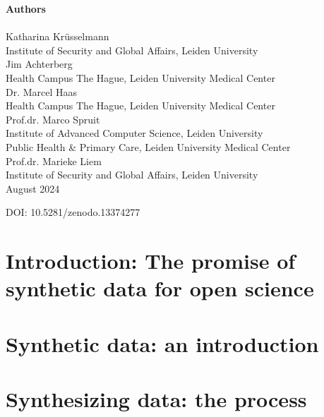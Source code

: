 \documentclass[12pt, twoside]{book}
\begin{document}
\textbf{Authors} \\\\
Katharina Krüsselmann  \\
Institute of Security and Global Affairs, Leiden University \\

Jim Achterberg   \\
Health Campus The Hague, Leiden University Medical Center \\

Dr. Marcel Haas  \\
Health Campus The Hague, Leiden University Medical Center \\

Prof.dr. Marco Spruit  \\
Institute of Advanced Computer Science, Leiden University \\
Public Health \& Primary Care, Leiden University Medical Center \\

Prof.dr. Marieke Liem  \\
Institute of Security and Global Affairs, Leiden University \\

August 2024

DOI: 10.5281/zenodo.13374277
\vspace*{\fill}

\newpage
\tableofcontents
    \thispagestyle{empty}

\cleardoublepage



\chapter{Introduction: The promise of synthetic data for open science}


\chapter{Synthetic data: an introduction}


\chapter{Synthesizing data: the process}

\end{document}
